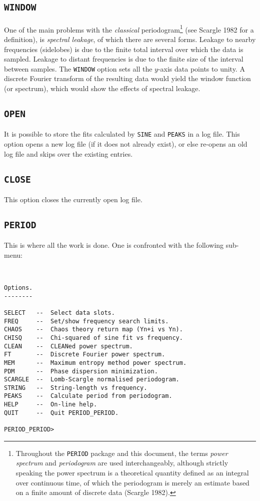 \subsection*{\tt WINDOW}

One of the main problems with the {\em classical}
periodogram\footnote{Throughout the {\tt PERIOD} package and this document, the
terms {\em power spectrum} and {\em periodogram} are used interchangeably,
although strictly speaking the power spectrum is a theoretical quantity defined
as an integral over continuous time, of which the periodogram is merely an
estimate based on a finite amount of discrete data (Scargle 1982).}  (see
Scargle 1982 for a definition), is {\em spectral leakage}, of which there are
several forms. Leakage to nearby frequencies (sidelobes) is due to the finite
total interval over which the data is sampled. Leakage to distant frequencies
is due to the finite size of the interval between samples. The {\tt WINDOW}
option sets all the $y$-axis data points to unity. A discrete Fourier transform
of the resulting data would yield the window function (or spectrum), which
would show the effects of spectral leakage. 

\subsection*{\tt OPEN}

It is possible to store the fits calculated by {\tt SINE} and {\tt PEAKS} in a
log file. This option opens a new log file (if it does not already exist), or
else re-opens an old log file and skips over the existing entries. 

\subsection*{\tt CLOSE}

This option closes the currently open log file. 

\subsection*{\tt PERIOD}

This is where all the work is done. One is confronted with the following 
sub-menu: 

\begin{verbatim}


Options.
--------

SELECT   --  Select data slots.
FREQ     --  Set/show frequency search limits.
CHAOS    --  Chaos theory return map (Yn+i vs Yn).
CHISQ    --  Chi-squared of sine fit vs frequency.
CLEAN    --  CLEANed power spectrum.
FT       --  Discrete Fourier power spectrum.
MEM      --  Maximum entropy method power spectrum.
PDM      --  Phase dispersion minimization.
SCARGLE  --  Lomb-Scargle normalised periodogram.
STRING   --  String-length vs frequency.
PEAKS    --  Calculate period from periodogram.
HELP     --  On-line help.
QUIT     --  Quit PERIOD_PERIOD.

PERIOD_PERIOD> 

\end{verbatim}

